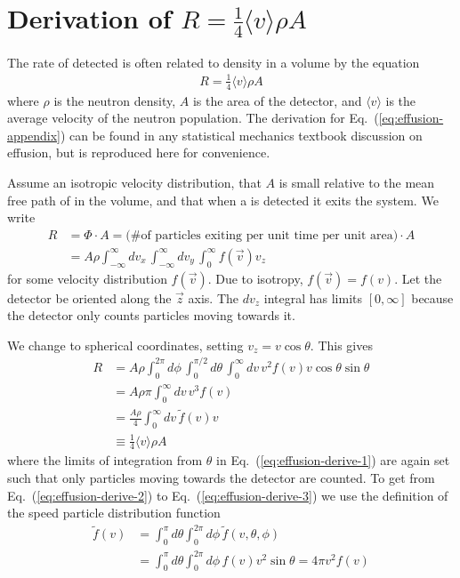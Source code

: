 
\chapter{
    \texorpdfstring{Derivation of $R=\frac{1}{4}\langle v \rangle \rho A$}
    {R=1/4 v rho A}
}

The rate of detected \ucn is often related to density in a volume by the equation
%
\begin{gather}
    R=\frac{1}{4}\langle v \rangle \rho A\label{eq:effusion-appendix}
\end{gather}
%
where $\rho$ is the neutron density, $A$ is the area of the detector, and  $\langle v \rangle$ is the average velocity of the neutron population. The derivation for Eq.~(\ref{eq:effusion-appendix}) can be found in any statistical mechanics textbook discussion on effusion, but is reproduced here for convenience.

Assume an isotropic velocity distribution, that $A$ is small relative to the mean free path of \ucn in the volume, and that when a \ucn is detected it exits the system.  We write
%
\begin{align}
    R &=\Phi \cdot A = \text{(\# of particles exiting per unit time per unit area)} \cdot A \nonumber \\
    &= A \rho \int^\infty_{-\infty}dv_x \, \int^\infty_{-\infty}dv_y \, \int^\infty_{0} f(\vec{v})v_z
\end{align}
%
for some velocity distribution $f(\vec{v})$. Due to isotropy, $f(\vec{v})=f(v)$. Let the detector be oriented along the $\vec{z}$ axis. The $dv_z$ integral has limits $[0,\infty]$ because the detector only counts particles moving towards it.

We change to spherical coordinates, setting $v_z = v\cos \theta$. This gives
%
\begin{align}
    R &= A \rho \int^{2\pi}_0 d\phi \, \int^{\pi/2}_0 d\theta \, \int^\infty_0 dv \, v^2 f(v) v \cos \theta \sin \theta \label{eq:effusion-derive-1} \\
    &= A \rho \pi \int^\infty_0 dv \, v^3 f(v) \label{eq:effusion-derive-2} \\
    &= \frac{A\rho}{4} \int^\infty_0 dv \, \tilde{f}(v)v \label{eq:effusion-derive-3} \\
    &\equiv \frac{1}{4}\langle v \rangle \rho A
\end{align}
%
where the limits of integration from $\theta$ in Eq.~(\ref{eq:effusion-derive-1}) are again set such that only particles moving towards the detector are counted. To get from Eq.~(\ref{eq:effusion-derive-2}) to Eq.~(\ref{eq:effusion-derive-3}) we use the definition of the speed particle distribution function
%
\begin{align}
    \tilde{f}(v) &= \int^\pi_0 d\theta \int^{2\pi}_0 d\phi \, \tilde{f}(v,\theta,\phi) \\
    &= \int^\pi_0 d\theta \int^{2\pi}_0 d\phi \, f(v)v^2\sin \theta = 4\pi v^2 f(v)
\end{align}
